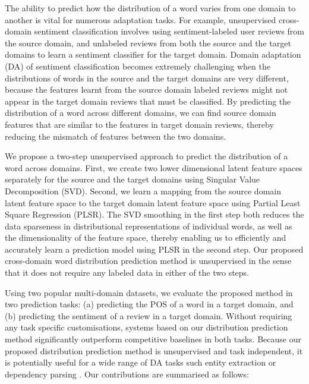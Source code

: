 \documentclass[11pt]{article}
\begin{document}
The ability to predict how the distribution of a word varies from one domain to another is vital
for numerous adaptation tasks. For example, unsupervised cross-domain sentiment classification
\cite{Blitzer:ACL:2007,Aue:2005} involves using sentiment-labeled
user reviews from the source domain, and unlabeled reviews from both the source and the target domains
to learn a sentiment classifier for the target domain. 
Domain adaptation (DA) of sentiment classification becomes extremely challenging
when the distributions of words in the source and the target domains are very different,
because the features  learnt from the source domain labeled reviews might not appear in the 
target domain reviews that must be classified. By predicting the distribution of a word
across different domains, we can find source domain features that are similar to the features in
target domain reviews, thereby reducing the mismatch of features between the two domains.


We propose a two-step unsupervised approach to predict the distribution of a word across domains.
First, we create two lower dimensional latent feature spaces separately for the source and the target domains
using Singular Value Decomposition (SVD). 
Second, we learn a mapping from the source domain latent feature space to the target domain latent feature space
using Partial Least Square Regression (PLSR). 
The SVD smoothing in the first step both reduces the data sparseness in distributional representations
of individual words, as well as the dimensionality of the feature space, thereby enabling us to efficiently
and accurately learn a prediction model using PLSR in the second step.
Our proposed cross-domain word distribution prediction method is unsupervised in the sense that
it does not require any labeled data in either of the two steps.

Using two popular multi-domain datasets, we evaluate the proposed method in two prediction tasks: 
(a) predicting the POS of a word in a target domain, 
and (b) predicting the sentiment of a review in a target domain.
Without requiring any task specific customisations, systems based on our distribution prediction method
significantly outperform competitive baselines in both tasks. 
Because our proposed distribution prediction method is unsupervised and
task independent, it is potentially useful for a wide range of DA tasks
such entity extraction \cite{Guo:NAACL:2009} or dependency parsing \cite{McClosky:NAACL:2010}.
Our contributions are summarised as follows:
\end{document}
